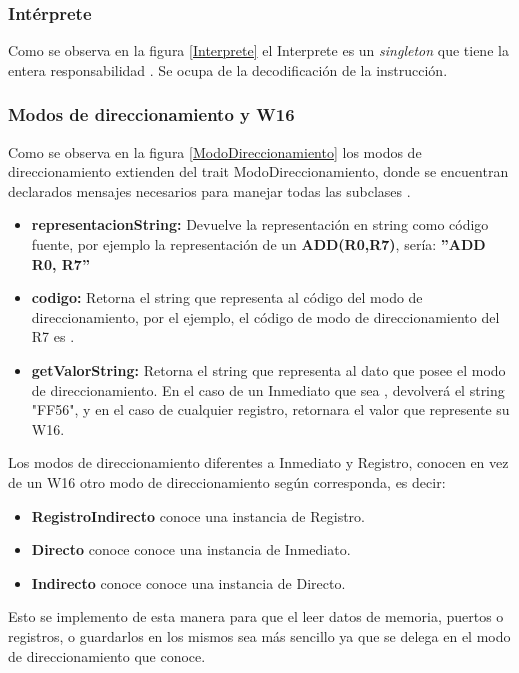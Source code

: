\subsubsection{Intérprete}
Como se observa en la figura \ref{Interprete} el Interprete es un \textit{singleton} que tiene la entera responsabilidad . Se ocupa de la decodificación de la instrucción.


\subsubsection{Modos de direccionamiento y W16}
Como se observa en la figura \ref{ModoDireccionamiento} los modos de direccionamiento extienden del trait ModoDireccionamiento, donde se encuentran declarados mensajes necesarios para manejar todas las subclases . 
\begin{itemize}
\item  \textbf{representacionString:}
Devuelve la representación en string como código fuente, por ejemplo la representación de un  \textbf{ADD(R0,R7)}, sería: \textbf{''ADD R0, R7''}
\item  \textbf{codigo:}
Retorna el string que representa al código del modo de direccionamiento, por el ejemplo, el código de modo de direccionamiento del R7 es .
\item  \textbf{getValorString:}
Retorna el string que representa al dato que posee el modo de direccionamiento. En el caso de un Inmediato que sea , devolverá el string "FF56", y en el caso de cualquier registro, retornara el valor que represente su W16.
\end{itemize}
Los modos de direccionamiento diferentes a Inmediato y Registro, conocen en vez de un W16 otro modo de direccionamiento según corresponda, es decir:
\begin{itemize}
\item \textbf{RegistroIndirecto} conoce una instancia de Registro.
\item \textbf{Directo} conoce conoce una instancia de Inmediato.
\item \textbf{Indirecto} conoce conoce una instancia de Directo.
\end{itemize}
Esto se implemento de esta manera para que el leer datos de memoria, puertos o registros, o guardarlos en los mismos sea más sencillo ya que se delega en el modo de direccionamiento que conoce.

